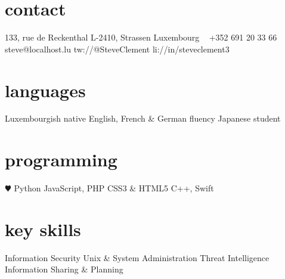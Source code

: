 \documentclass[a4paper]{friggeri-cv} %
\begin{document}


\begin{aside} %
\section{contact}
133, rue de Reckenthal
L-2410, Strassen
Luxembourg
~
+352 691 20 33 66
~
{steve@localhost.lu}
{tw://@SteveClement}
{li://in/steveclement3}
\section{languages}
Luxembourgish native
English, French \& German fluency
Japanese student
\section{programming}
{\color{red} $\varheartsuit$} Python
JavaScript, PHP
CSS3 \& HTML5
C++, Swift
\section{key skills}
Information Security
Unix \& System Administration
Threat Intelligence
Information Sharing \& Planning
\end{aside}

\end{document}
